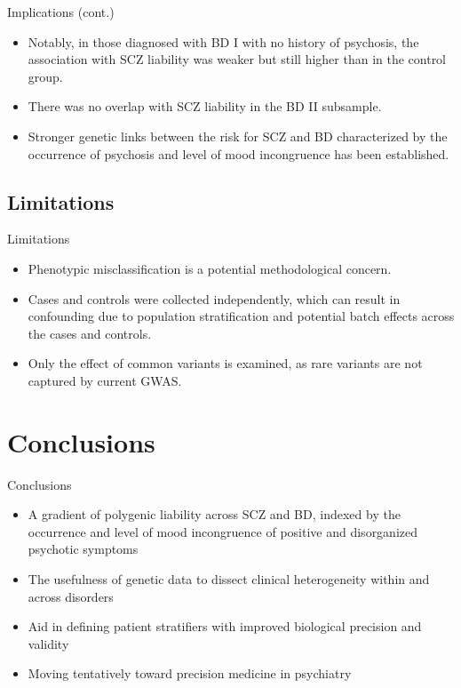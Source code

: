 \documentclass{beamer}
\begin{document}
\begin{frame}{Implications (cont.)}
    \begin{itemize}
        \item Notably, in those diagnosed with BD I with no history of
              psychosis, the association with SCZ liability was weaker but
              still higher than in the control group.
        \item There was no overlap with SCZ liability in the BD II subsample. 
        \item Stronger genetic links between the risk for SCZ and BD
              characterized by the occurrence of psychosis and level of mood
              incongruence has been established.
    \end{itemize}
\end{frame}

\subsection{Limitations}
\begin{frame}{Limitations}
    \begin{itemize}
        \item Phenotypic misclassification is a potential methodological concern.
        \item Cases and controls were collected independently, which can result
              in confounding due to population stratification and potential batch
              effects across the cases and controls.
        \item Only the effect of common variants is examined, as rare variants
              are not captured by current GWAS.
    \end{itemize}
\end{frame}

\section{Conclusions}
\begin{frame}{Conclusions}
    \begin{itemize}
        \item A gradient of polygenic liability across SCZ and BD, indexed by
              the occurrence and level of mood incongruence of positive and
              disorganized psychotic symptoms
        \item The usefulness of genetic data to dissect clinical heterogeneity
              within and across disorders
        \item Aid in defining patient stratifiers with improved biological
              precision and validity
        \item Moving tentatively toward precision medicine in psychiatry
    \end{itemize}
\end{frame}
\end{document}

